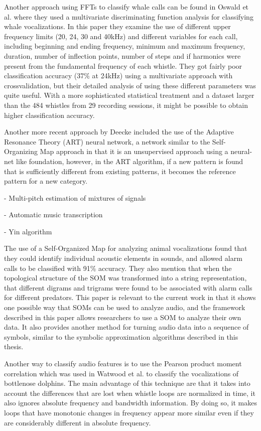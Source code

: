 \documentclass[12pt,oneside]{book}
\begin{document}
Another approach using FFTs to classify whale calls can be found in
Oswald et al. \cite{oswald03} where they used a multivariate
discriminating function analysis for classifying whale vocalizations.
In this paper they examine the use of different upper frequency limits
(20, 24, 30 and 40kHz) and different variables for each call,
including beginning and ending frequency, minimum and maximum
frequency, duration, number of inflection points, number of steps and
if harmonics were present from the fundamental frequency of each
whistle.  They got fairly poor classification accuracy (37\% at 24kHz)
using a multivariate approach with crossvalidation, but their detailed
analysis of using these different parameters was quite useful.  With a
more sophisticated statistical treatment and a dataset larger than the
484 whistles from 29 recording sessions, it might be possible to obtain
higher classification accuracy.


Another more recent approach by Deecke included the use of the
Adaptive Resonance Theory (ART) neural network, a network similar to
the Self-Organizing Map approach in that it is an unsupervised
approach using a neural-net like foundation, however, in the ART
algorithm, if a new pattern is found that is sufficiently different
from existing patterns, it becomes the reference pattern for a new
category.


- Multi-pitch estimation of mixtures of signals \cite{klapuri08}
\cite{fujihara12}

- Automatic music transcription \cite{benetos12}

- Yin algorithm

The use of a Self-Organized Map for analyzing animal vocalizations
\cite{placer06} found that they could identify individual acoustic
elements in sounds, and allowed alarm calls to be classified with 91\%
accuracy.  They also mention that when the topological structure of
the SOM was transformed into a string representation, that different
digrams and trigrams were found to be associated with alarm calls for
different predators.  This paper is relevant to the current work in
that it shows one possible way that SOMs can be used to analyze audio,
and the framework described in this paper allows researchers to use a
SOM to analyze their own data.  It also provides another method for
turning audio data into a sequence of symbols, similar to the symbolic
approximation algorithms described in this thesis.

Another way to classify audio features is to use the Pearson product
moment correlation which was used in Watwood et al. \cite{watwood04}
to classify the vocalizations of bottlenose dolphins.  The main
advantage of this technique are that it takes into account the
differences that are lost when whistle loops are normalized in time,
it also ignores absolute frequency and bandwidth information.  By
doing so, it makes loops that have monotonic changes in frequency
appear more similar even if they are considerably different in
absolute frequency.
\end{document}
